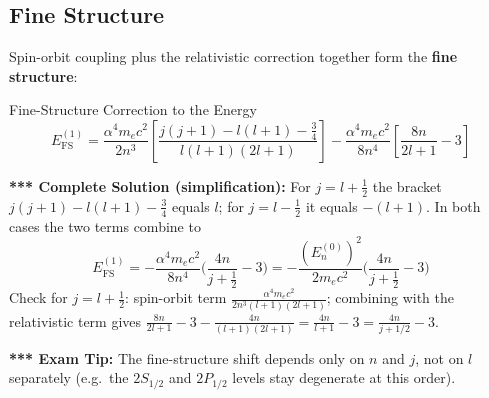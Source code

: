 \documentclass[11pt,a4paper]{article}
\begin{document}
\subsection{Fine Structure}
Spin-orbit coupling plus the relativistic correction together form the \textbf{fine structure}:
\begin{thm}{Fine-Structure Correction to the Energy}
\[
E^{(1)}_{\text{FS}} = \frac{\alpha^4m_ec^2}{2n^3}\left[\frac{j(j+1)-l(l+1)-\tfrac34}{l(l+1)(2l+1)}\right] - \frac{\alpha^4m_ec^2}{8n^4}\left[\frac{8n}{2l+1}-3\right]
\]
\end{thm}
\textbf{*** Complete Solution (simplification):} For $j=l+\tfrac12$ the bracket $j(j+1)-l(l+1)-\frac34$ equals $l$; for $j=l-\tfrac12$ it equals $-(l+1)$. In both cases the two terms combine to
\[
E^{(1)}_{\text{FS}} = -\frac{\alpha^4m_ec^2}{8n^4}\Big(\frac{4n}{j+\frac12}-3\Big) = -\frac{(E_n^{(0)})^2}{2m_ec^2}\Big(\frac{4n}{j+\frac12}-3\Big)
\]
Check for $j=l+\tfrac12$: spin-orbit term $\frac{\alpha^4m_ec^2}{2n^3(l+1)(2l+1)}$; combining with the relativistic term gives $\frac{8n}{2l+1}-3-\frac{4n}{(l+1)(2l+1)} = \frac{4n}{l+1}-3 = \frac{4n}{j+1/2}-3$. \checkmark

\textbf{*** Exam Tip:} The fine-structure shift depends only on $n$ and $j$, not on $l$ separately (e.g.\ the $2S_{1/2}$ and $2P_{1/2}$ levels stay degenerate at this order).
\end{document}
